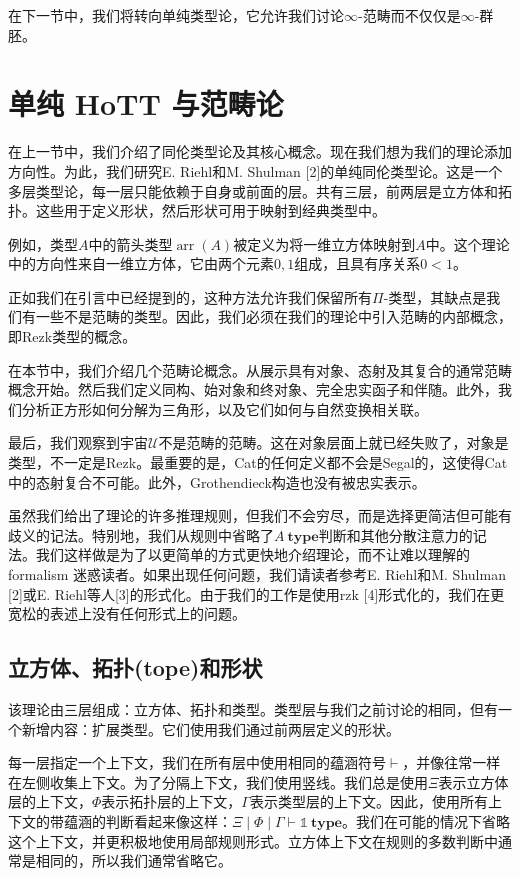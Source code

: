 \documentclass{ctexrep}
\theoremstyle{plain}
\theoremstyle{definition}
\theoremstyle{remark}
\theoremstyle{definition}
\theoremstyle{definition}
\theoremstyle{definition}
\newcommand{\Type}{\textbf{type}}
\newcommand{\arr}{\operatorname{arr}}
\newcommand{\UU}{\mathcal{U}}
\begin{document}
在下一节中，我们将转向单纯类型论，它允许我们讨论$\infty$-范畴而不仅仅是$\infty$-群胚。

\chapter{单纯 HoTT 与范畴论}

在上一节中，我们介绍了同伦类型论及其核心概念。现在我们想为我们的理论添加方向性。为此，我们研究E. Riehl和M. Shulman [2]的单纯同伦类型论。这是一个多层类型论，每一层只能依赖于自身或前面的层。共有三层，前两层是立方体和拓扑。这些用于定义形状，然后形状可用于映射到经典类型中。

例如，类型$A$中的箭头类型$\arr(A)$被定义为将一维立方体映射到$A$中。这个理论中的方向性来自一维立方体，它由两个元素$0,1$组成，且具有序关系$0<1$。

正如我们在引言中已经提到的，这种方法允许我们保留所有$\Pi$-类型，其缺点是我们有一些不是范畴的类型。因此，我们必须在我们的理论中引入范畴的内部概念，即Rezk类型的概念。

在本节中，我们介绍几个范畴论概念。从展示具有对象、态射及其复合的通常范畴概念开始。然后我们定义同构、始对象和终对象、完全忠实函子和伴随。此外，我们分析正方形如何分解为三角形，以及它们如何与自然变换相关联。

最后，我们观察到宇宙$\UU$不是范畴的范畴。这在对象层面上就已经失败了，对象是类型，不一定是Rezk。最重要的是，Cat的任何定义都不会是Segal的，这使得Cat中的态射复合不可能。此外，Grothendieck构造也没有被忠实表示。

虽然我们给出了理论的许多推理规则，但我们不会穷尽，而是选择更简洁但可能有歧义的记法。特别地，我们从规则中省略了$A\ \Type$判断和其他分散注意力的记法。我们这样做是为了以更简单的方式更快地介绍理论，而不让难以理解的 formalism 迷惑读者。如果出现任何问题，我们请读者参考E. Riehl和M. Shulman [2]或E. Riehl等人[3]的形式化。由于我们的工作是使用rzk [4]形式化的，我们在更宽松的表述上没有任何形式上的问题。

\section{立方体、拓扑(tope)和形状}

该理论由三层组成：立方体、拓扑和类型。类型层与我们之前讨论的相同，但有一个新增内容：扩展类型。它们使用我们通过前两层定义的形状。

每一层指定一个上下文，我们在所有层中使用相同的蕴涵符号$\vdash$，并像往常一样在左侧收集上下文。为了分隔上下文，我们使用竖线。我们总是使用$\Xi$表示立方体层的上下文，$\Phi$表示拓扑层的上下文，$\Gamma$表示类型层的上下文。因此，使用所有上下文的带蕴涵的判断看起来像这样：$\Xi\mid\Phi\mid\Gamma\vdash \mathbb{1}\ \Type$。我们在可能的情况下省略这个上下文，并更积极地使用局部规则形式。立方体上下文在规则的多数判断中通常是相同的，所以我们通常省略它。
\end{document}
